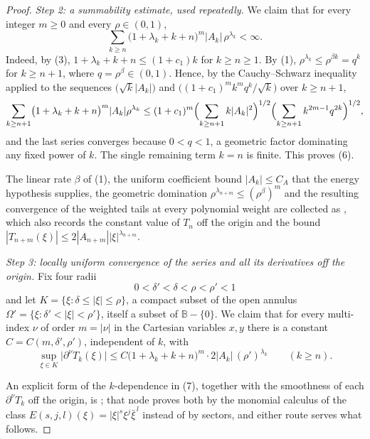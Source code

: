 \begin{proof}
\emph{Step 2: a summability estimate, used repeatedly.}  We claim that for
every integer $m\ge0$ and every $\rho\in(0,1)$,
\begin{equation}\tag{6}
  \sum_{k\ge n}\bigl(1+\lambda_k+k+n\bigr)^{m}|A_k|\,\rho^{\lambda_k}<\infty .
\end{equation}
Indeed, by (3), $1+\lambda_k+k+n\le(1+c_1)k$ for $k\ge n\ge1$.  By (1),
$\rho^{\lambda_k}\le\rho^{\beta k}=q^{k}$ for $k\ge n+1$, where
$q=\rho^{\beta}\in(0,1)$.  Hence, by the Cauchy--Schwarz inequality applied to
the sequences $\bigl(\sqrt{k}|A_k|\bigr)$ and
$\bigl((1+c_1)^{m}k^{m}q^{k}/\sqrt{k}\bigr)$ over $k\ge n+1$,
\[
  \sum_{k\ge n+1}\bigl(1+\lambda_k+k+n\bigr)^{m}|A_k|\rho^{\lambda_k}
  \le(1+c_1)^{m}\Bigl(\sum_{k\ge n+1}k|A_k|^2\Bigr)^{1/2}
    \Bigl(\sum_{k\ge n+1}k^{2m-1}q^{2k}\Bigr)^{1/2},
\]
and the last series converges because $0<q<1$, a geometric factor dominating
any fixed power of $k$.  The single remaining term $k=n$ is finite.  This
proves (6).

The linear rate $\beta$ of (1), the uniform coefficient bound
$|A_k|\le C_A$ that the energy hypothesis supplies, the geometric domination
$\rho^{\lambda_{n+m}}\le(\rho^{\beta})^{m}$ and the resulting convergence of
the weighted tails at every polynomial weight are collected as
, which also records the constant value
of $T_n$ off the origin and the bound
$|T_{n+m}(\xi)|\le2|A_{n+m}||\xi|^{\lambda_{n+m}}$.

\emph{Step 3: locally uniform convergence of the series and all its
derivatives off the origin.}  Fix four radii
\[
  0<\delta'<\delta<\rho<\rho'<1
\]
and let $K=\{\xi:\delta\le|\xi|\le\rho\}$, a compact subset of the open
annulus $\Omega'=\{\xi:\delta'<|\xi|<\rho'\}$, itself a subset of
$\mathbb{B}-\{0\}$.  We claim that for every multi-index $\nu$ of order
$m=|\nu|$ in the Cartesian variables $x,y$ there is a constant
$C=C(m,\delta',\rho')$, independent of $k$, with
\begin{equation}\tag{7}
  \sup_{\xi\in K}\bigl|\partial^{\nu}T_k(\xi)\bigr|
  \le C\bigl(1+\lambda_k+k+n\bigr)^{m}\cdot2|A_k|\,(\rho')^{\lambda_k}
  \qquad(k\ge n).
\end{equation}

An explicit form of the $k$-dependence in (7), together with the smoothness of
each $\partial^{\nu}T_k$ off the origin, is
; that node proves both by the monomial
calculus of the class $E(s,j,l)(\xi)=|\xi|^{s}\xi^{j}\bar\xi^{\,l}$ instead of
by sectors, and either route serves what follows.



\end{proof}
